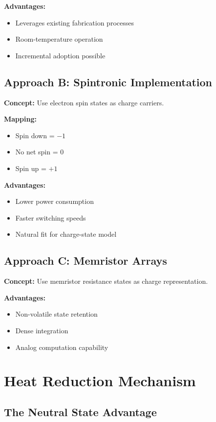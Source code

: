 \documentclass[11pt,a4paper]{article}
\begin{document}
\textbf{Advantages:}
\begin{itemize}
\item Leverages existing fabrication processes
\item Room-temperature operation
\item Incremental adoption possible
\end{itemize}

\subsection{Approach B: Spintronic Implementation}

\textbf{Concept:} Use electron spin states as charge carriers.

\textbf{Mapping:}
\begin{itemize}
\item Spin down = $-1$
\item No net spin = $0$
\item Spin up = $+1$
\end{itemize}

\textbf{Advantages:}
\begin{itemize}
\item Lower power consumption
\item Faster switching speeds
\item Natural fit for charge-state model
\end{itemize}

\subsection{Approach C: Memristor Arrays}

\textbf{Concept:} Use memristor resistance states as charge representation.

\textbf{Advantages:}
\begin{itemize}
\item Non-volatile state retention
\item Dense integration
\item Analog computation capability
\end{itemize}

\section{Heat Reduction Mechanism}

\subsection{The Neutral State Advantage}
\end{document}
